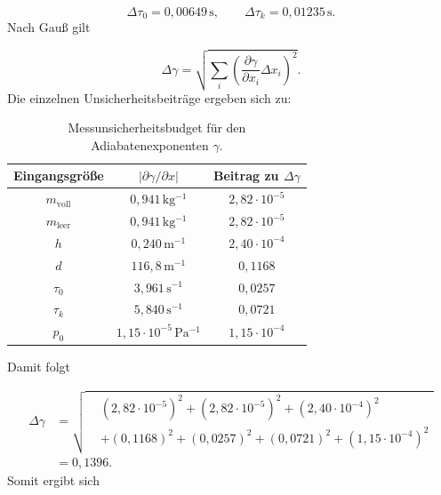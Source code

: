 \documentclass{report}
\begin{document}
\begin{equation}
\Delta\tau_0=0{,}00649\,\mathrm{s},
\qquad
\Delta\tau_k=0{,}01235\,\mathrm{s}.
\end{equation}
\noindent
Nach Gauß gilt

\begin{equation}
\Delta\gamma
=
\sqrt{
\sum_i
\left(
\frac{\partial\gamma}{\partial x_i}
\Delta x_i
\right)^2
}.
\end{equation}
\noindent
Die einzelnen Unsicherheitsbeiträge ergeben sich zu:

\begin{table}[htbp]
    \centering
    \caption{Messunsicherheitsbudget für den Adiabatenexponenten $\gamma$.}
    \label{tab:budget_gamma}
    \begin{tabular}{c|c|c}
        \hline
        Eingangsgröße
        & $\left|\partial\gamma/\partial x\right|$
        & Beitrag zu $\Delta\gamma$\\
        \hline
        $m_\mathrm{voll}$ & $0{,}941\,\mathrm{kg^{-1}}$
                         & $2{,}82\cdot10^{-5}$\\
        $m_\mathrm{leer}$ & $0{,}941\,\mathrm{kg^{-1}}$
                         & $2{,}82\cdot10^{-5}$\\
        $h$ & $0{,}240\,\mathrm{m^{-1}}$
            & $2{,}40\cdot10^{-4}$\\
        $d$ & $116{,}8\,\mathrm{m^{-1}}$
            & $0{,}1168$\\
        $\tau_0$ & $3{,}961\,\mathrm{s^{-1}}$
                 & $0{,}0257$\\
        $\tau_k$ & $5{,}840\,\mathrm{s^{-1}}$
                 & $0{,}0721$\\
        $p_0$ & $1{,}15\cdot10^{-5}\,\mathrm{Pa^{-1}}$
              & $1{,}15\cdot10^{-4}$\\
        \hline
    \end{tabular}
\end{table}
\noindent
Damit folgt

\begin{align}
\Delta\gamma
&=
\sqrt{
\begin{aligned}
&(2{,}82\cdot10^{-5})^2
+(2{,}82\cdot10^{-5})^2
+(2{,}40\cdot10^{-4})^2\\
&+(0{,}1168)^2
+(0{,}0257)^2
+(0{,}0721)^2
+(1{,}15\cdot10^{-4})^2
\end{aligned}
}
\\
&=
0{,}1396.
\end{align}
\noindent
Somit ergibt sich
\end{document}
